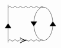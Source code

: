 \begin{equation}
    \begin{aligned}
\begin{tikzpicture}[x=0.65pt,y=0.65pt,yscale=-1,xscale=1]
\draw    (351.31,56.38) -- (351.31,127.1) ;
\draw   (417.22,61.11) .. controls (427.06,61.11) and (435.03,75.02) .. (435.03,92.19) .. controls (435.03,109.35) and (427.06,123.27) .. (417.22,123.27) .. controls (407.38,123.27) and (399.41,109.35) .. (399.41,92.19) .. controls (399.41,75.02) and (407.38,61.11) .. (417.22,61.11) -- cycle ;
\draw  [fill={rgb, 255:red, 0; green, 0; blue, 0 }  ,fill opacity=1 ] (435.03,88.02) -- (440.68,96.36) -- (429.39,96.36) -- cycle ;
\draw  [fill={rgb, 255:red, 0; green, 0; blue, 0 }  ,fill opacity=1 ] (351.31,91.74) -- (356.96,100.08) -- (345.66,100.08) -- cycle ;
\draw  [fill={rgb, 255:red, 0; green, 0; blue, 0 }  ,fill opacity=1 ] (399.41,96.36) -- (393.76,88.02) -- (405.05,88.02) -- cycle ;
\draw    (351.92,123.27) .. controls (353.59,121.6) and (355.25,121.6) .. (356.92,123.27) .. controls (358.59,124.94) and (360.25,124.94) .. (361.92,123.27) .. controls (363.59,121.6) and (365.25,121.6) .. (366.92,123.27) .. controls (368.59,124.94) and (370.25,124.94) .. (371.92,123.27) .. controls (373.59,121.6) and (375.25,121.6) .. (376.92,123.27) .. controls (378.59,124.94) and (380.25,124.94) .. (381.92,123.27) .. controls (383.59,121.6) and (385.25,121.6) .. (386.92,123.27) .. controls (388.59,124.94) and (390.25,124.94) .. (391.92,123.27) .. controls (393.59,121.6) and (395.25,121.6) .. (396.92,123.27) .. controls (398.59,124.94) and (400.25,124.94) .. (401.92,123.27) .. controls (403.59,121.6) and (405.25,121.6) .. (406.92,123.27) .. controls (408.59,124.94) and (410.25,124.94) .. (411.92,123.27) .. controls (413.59,121.6) and (415.25,121.6) .. (416.92,123.27) -- (417.22,123.27) -- (417.22,123.27) ;
\draw [shift={(384.57,123.27)}, rotate = 180] [color={rgb, 255:red, 0; green, 0; blue, 0 }  ][line width=0.75]    (10.93,-4.9) .. controls (6.95,-2.3) and (3.31,-0.67) .. (0,0) .. controls (3.31,0.67) and (6.95,2.3) .. (10.93,4.9)   ;
\draw    (351.92,61.11) .. controls (353.59,59.44) and (355.25,59.44) .. (356.92,61.11) .. controls (358.59,62.78) and (360.25,62.78) .. (361.92,61.11) .. controls (363.59,59.44) and (365.25,59.44) .. (366.92,61.11) .. controls (368.59,62.78) and (370.25,62.78) .. (371.92,61.11) .. controls (373.59,59.44) and (375.25,59.44) .. (376.92,61.11) .. controls (378.59,62.78) and (380.25,62.78) .. (381.92,61.11) .. controls (383.59,59.44) and (385.25,59.44) .. (386.92,61.11) .. controls (388.59,62.78) and (390.25,62.78) .. (391.92,61.11) .. controls (393.59,59.44) and (395.25,59.44) .. (396.92,61.11) .. controls (398.59,62.78) and (400.25,62.78) .. (401.92,61.11) .. controls (403.59,59.44) and (405.25,59.44) .. (406.92,61.11) .. controls (408.59,62.78) and (410.25,62.78) .. (411.92,61.11) .. controls (413.59,59.44) and (415.25,59.44) .. (416.92,61.11) -- (417.22,61.11) -- (417.22,61.11) ;

\end{tikzpicture}
\end{aligned}
\end{equation}
